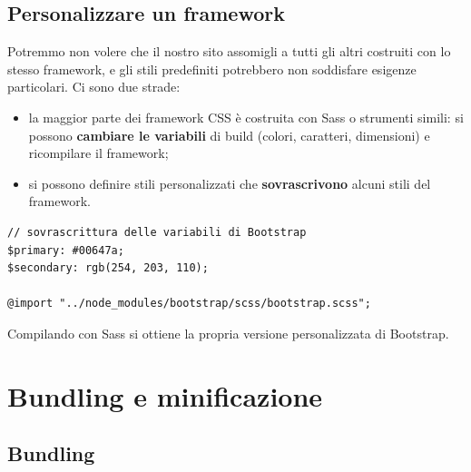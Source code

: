 \subsection{Personalizzare un framework}

Potremmo non volere che il nostro sito assomigli a tutti gli altri costruiti con
lo stesso framework, e gli stili predefiniti potrebbero non soddisfare
esigenze particolari. Ci sono due strade:

\begin{itemize}
  \item la maggior parte dei framework CSS è costruita con Sass o strumenti
        simili: si possono \textbf{cambiare le variabili} di build (colori,
        caratteri, dimensioni) e ricompilare il framework;
  \item si possono definire stili personalizzati che \textbf{sovrascrivono}
        alcuni stili del framework.
\end{itemize}

\begin{affianco}[0.6][c]
\begin{lstlisting}[style=css, name=custom.scss]
// sovrascrittura delle variabili di Bootstrap
$primary: #00647a;
$secondary: rgb(254, 203, 110);

@import "../node_modules/bootstrap/scss/bootstrap.scss";
\end{lstlisting}
\risultato
\begin{browser}
  \quad
\end{browser}
\end{affianco}

Compilando con Sass si ottiene la propria versione personalizzata di Bootstrap.

\section{Bundling e minificazione}

\subsection{Bundling}


